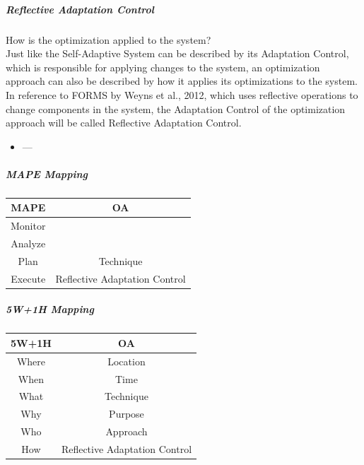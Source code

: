 \subparagraph*{Reflective Adaptation Control}
How is the optimization applied to the system? \\
Just like the Self-Adaptive System can be described by its Adaptation Control,
which is responsible for applying changes to the system,
an optimization approach can also be described by how it applies its optimizations to the system.
In reference to FORMS by Weyns et al., 2012\cite*{FORMS}, which uses reflective operations to change
components in the system, the Adaptation Control of the optimization approach will be called Reflective Adaptation Control.

\begin{itemize}
    \item ---
\end{itemize}

\subparagraph*{MAPE Mapping}
\begin{tabular}{|c|c|}
    \hline
    MAPE & OA \\
    \hline
    Monitor & \\
    \hline
    Analyze & \\
    \hline
    Plan & Technique \\
    \hline
    Execute & Reflective Adaptation Control \\
    \hline
\end{tabular}

\subparagraph*{5W+1H Mapping}
\begin{tabular}{|c|c|}
    \hline
    5W+1H & OA \\
    \hline
    Where & Location\\
    \hline
    When & Time \\
    \hline
    What & Technique \\
    \hline
    Why & Purpose \\
    \hline
    Who & Approach \\ %
    \hline
    How & Reflective Adaptation Control \\
    \hline
\end{tabular}